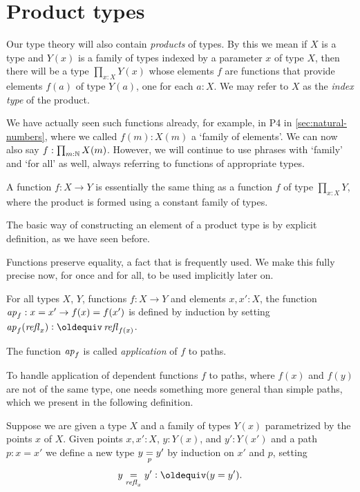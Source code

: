 \section{Product types}
\label{sec:product-types}
Our type theory will also contain \emph{products} of types. 
By this we mean if $X$ is a type and $Y(x)$ is a family of types indexed by a
parameter $x$ of type $X$, then there will be a type $\prod_{x:X} Y(x)$ 
whose elements $f$ are functions that provide elements $f(a)$ of type
$Y(a)$, one for each $a:X$. We may refer to $X$ as the 
\emph{index type} of the product.

We have actually seen such functions already, for example,
in P4 in \cref{sec:natural-numbers}, where
we called $f(m):X(m)$ a `family of elements'. We can now
also say $f: \prod_{m:\NN} X(m)$. However, we will continue to use
phrases with `family' and `for all' as well, always referring to functions
of appropriate types.

A function $f : X \to Y$ is essentially the same thing as a function $f$ 
of type $\prod_{x:X} Y$, where the product is formed using a constant family of types.

The basic way of constructing an element of a product type
is by explicit definition, as we have seen before.

Functions preserve equality, a fact that is frequently used.
We make this fully precise now, for once and for all, 
to be used implicitly later on.

\begin{definition}\label{def:ap}
For all types $X$, $Y$, functions $f:X\to Y$ and elements $x,x':X$, the function
$\ap{f} : x = x' \to f(x) = f(x')$ is defined by induction by setting 
$\ap{f}(\refl{x})\defeq\refl{f(x)}$.
\end{definition}

The function $\ap f$ is called {\em application} of $f$ to paths.

To handle application of dependent functions $f$ to paths, where $f(x)$ and $f(y)$ are not of the same type, one needs something more general
than simple paths, which we present in the following definition.

\begin{definition}\label{def:pathsoverpaths}
  Suppose we are given a type $X$ and a family of types $Y(x)$ parametrized by the points $x$ of $X$.  Given points $x,x':X$, $y:Y(x)$, and
  $y':Y(x')$ and a path $p : x = x'$ we define a new type $\pathover y Y p {y'}$ by induction on $x'$ and $p$, setting
  $$\pathover y Y {\refl x} {y'} \defeq (y = y').$$
\end{definition}

